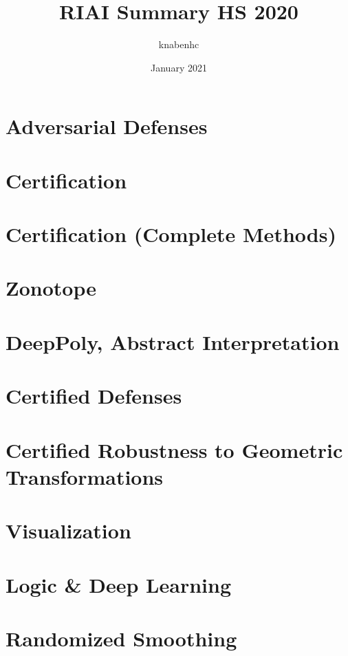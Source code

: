\documentclass[11pt]{article}
\title{RIAI Summary HS 2020}
\author{knabenhc }
\date{January 2021}
\begin{document}
\pagestyle{empty}
\begin{multicols*}{3}

\section*{Adversarial Defenses}
\section*{Certification}
\section*{Certification (Complete Methods)}
\section*{Zonotope}
\section*{DeepPoly, Abstract Interpretation}
\section*{Certified Defenses}
\section*{Certified Robustness to Geometric Transformations}
\section*{Visualization}
\section*{Logic \& Deep Learning}
\section*{Randomized Smoothing}
\end{multicols*}
\end{document}
